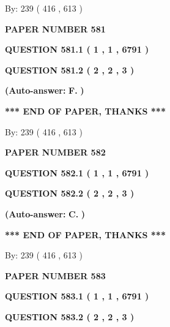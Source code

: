 \documentclass[12pt]{article}
\begin{document}
   
\hspace{1.0in} By: 
 239 ( 416 ,  613 )
   
   
   
   
\newpage 
\setcounter{page}{ 
   581001 } 
   
   
 {\textbf{ \Large{ PAPER NUMBER  581  }}}
   
   
   
   
  
  
{\textbf{\large{QUESTION
581.1 
 ( 1 , 1 , 6791 )
}}}
  
  
{\textbf{\large{QUESTION
581.2 
 ( 2 , 2 , 3 )
}}}
 
 
{\textbf{(Auto-answer:}}
{\textbf{\large{
F.}}}
{\textbf{)}}
 
 
   
   
   
   
\vspace{1.0in} 
{\textbf{\large{ *** END OF PAPER, THANKS *** }}} 
   
   
\hspace{1.0in} By: 
 239 ( 416 ,  613 )
   
   
   
   
\newpage 
\setcounter{page}{ 
   582001 } 
   
   
 {\textbf{ \Large{ PAPER NUMBER  582  }}}
   
   
   
   
  
  
{\textbf{\large{QUESTION
582.1 
 ( 1 , 1 , 6791 )
}}}
  
  
{\textbf{\large{QUESTION
582.2 
 ( 2 , 2 , 3 )
}}}
 
 
{\textbf{(Auto-answer:}}
{\textbf{\large{
C.}}}
{\textbf{)}}
 
 
   
   
   
   
\vspace{1.0in} 
{\textbf{\large{ *** END OF PAPER, THANKS *** }}} 
   
   
\hspace{1.0in} By: 
 239 ( 416 ,  613 )
   
   
   
   
\newpage 
\setcounter{page}{ 
   583001 } 
   
   
 {\textbf{ \Large{ PAPER NUMBER  583  }}}
   
   
   
   
  
  
{\textbf{\large{QUESTION
583.1 
 ( 1 , 1 , 6791 )
}}}
  
  
{\textbf{\large{QUESTION
583.2 
 ( 2 , 2 , 3 )
}}}
 
\end{document}
